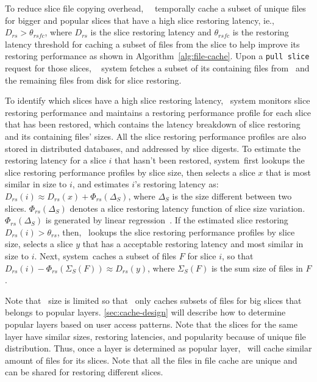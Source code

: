 

To reduce slice file copying overhead,
\sysname~\filecachename~temporally cache a subset of unique files for bigger and popular slices that have a high slice restoring latency, ie., $D_{rs} > \theta_{rsfc}$, 
where $D_{rs}$ is the slice restoring latency and $\theta_{rsfc}$ is the restoring latency threshold for 
caching
a subset of files from the slice to help improve its restoring performance as shown in Algorithm~\ref{alg:file-cache}.
Upon a \texttt{pull slice} request for those slices, 
\dedupname~ system fetches a subset of its containing files from \filecachename~and
the remaining files from disk for slice restoring.

To identify which slices have a high slice restoring latency,
\dedupname~system monitors slice restoring performance and 
maintains a restoring performance  profile for each slice that has been restored,
which contains the latency breakdown of slice restoring
and its containing files' sizes.
All the slice restoring performance profiles are also stored in distributed  databases,
 and addressed by slice digests. 
To estimate the restoring latency for a slice $i$ that hasn't been restored, 
\dedupname system~first lookups the slice restoring performance profiles by slice size,
 then selects a slice $x$ that is most similar in size to $i$,
 and estimates $i$'s restoring latency as: 
 $D_{rs}(i) \approx D_{rs}(x) + \Phi_{rs}(\Delta_{S})$,
 where $\Delta_{S}$ is the size different between two slices.
 $\Phi_{rs}(\Delta_{S})$ denotes a slice restoring latency function of slice size variation.
  $\Phi_{rs}(\Delta_{S})$ is generated by linear regression~\cite{xxx}.
If the estimated slice restoring $D_{rs}(i) > \theta_{rs}$,
then, \dedupname~lookups the slice restoring performance profiles by slice size,
selects a slice $y$ that has a acceptable restoring latency and
most similar in size to $i$.
Next, \dedupname system~caches a subset of files $F$ for slice $i$, so that
$D_{rs}(i) - \Phi_{rs}(\Sigma_{S}(F)) \approx D_{rs}(y)$,
where $\Sigma_{S}(F)$ is the sum size of files in $F$.

Note that \filecachename~size is limited so that \filecachename~only caches 
subsets of files for big slices that belongs to popular layers.
\cref{sec:cache-design} will describe how to determine popular layers based on user access patterns.
Note that the slices for the same layer have similar sizes, restoring latencies, and popularity 
because of unique file
distribution. 
Thus, once a layer is determined as popular layer, 
\dedupname~will cache similar amount of files for its slices.
Note that all the files in file cache are unique and can be shared for restoring different slices.


